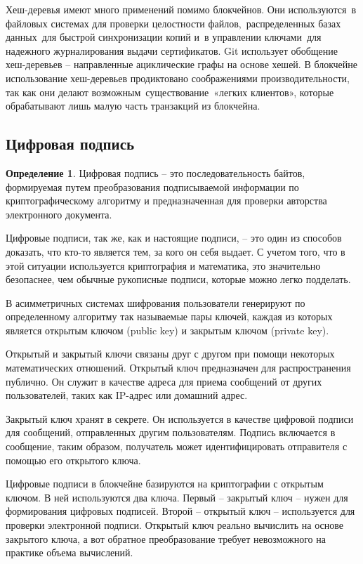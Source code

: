 \documentclass[och, master, pract]{SCWorks_fix}
\theoremstyle{plain}
\theoremstyle{plain}
\theoremstyle{plain}
\theoremstyle{definition}
\newtheorem{defn}{Определение}
\begin{document}
Хеш-деревья имеют много применений помимо блокчейнов. Они используются в файловых системах для проверки целостности файлов, распределенных базах данных для быстрой синхронизации копий и в управлении ключами для надежного журналирования выдачи сертификатов. Git использует обобщение хеш-деревьев – направленные ациклические графы на основе хешей. В блокчейне использование хеш-деревьев продиктовано соображениями производительности, так как они делают возможным существование «легких клиентов», которые обрабатывают лишь малую часть транзакций из блокчейна.

\subsection{Цифровая подпись}
\begin{defn}
Цифровая подпись – это последовательность байтов, формируемая путем преобразования подписываемой информации по криптографическому алгоритму и предназначенная для проверки авторства электронного документа.\cite{bib:block:3}
\end{defn}

Цифровые подписи, так же, как и настоящие подписи, – это один из способов доказать, что кто-то является тем, за кого он себя выдает. С учетом того, что в этой ситуации используется криптография и математика, это значительно безопаснее, чем обычные рукописные подписи, которые можно легко подделать.

В асимметричных системах шифрования пользователи генерируют по определенному алгоритму так называемые пары ключей, каждая из которых является открытым ключом (public key) и закрытым ключом (private key).

Открытый и закрытый ключи связаны друг с другом при помощи некоторых математических отношений. Открытый ключ предназначен для распространения публично. Он служит в качестве адреса для приема сообщений от других пользователей, таких как IP-адрес или домашний адрес.

Закрытый ключ хранят в секрете. Он используется в качестве цифровой подписи для сообщений, отправленных другим пользователям. Подпись включается в сообщение, таким образом, получатель может идентифицировать отправителя с помощью его открытого ключа.

Цифровые подписи в блокчейне базируются на криптографии с открытым ключом. В ней используются два ключа. Первый – закрытый ключ – нужен для формирования цифровых подписей. Второй – открытый ключ – используется для проверки электронной подписи. Открытый ключ реально вычислить на основе закрытого ключа, а вот обратное преобразование требует невозможного на практике объема вычислений. 
\end{document}
